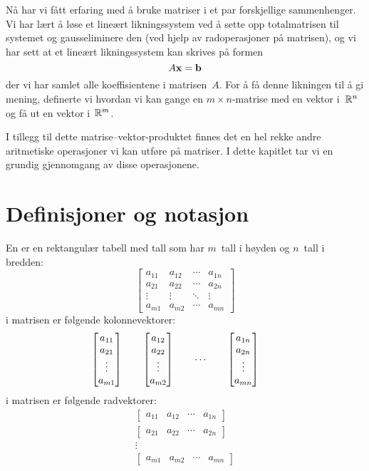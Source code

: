 

\label{ch:matriser}

Nå har vi fått erfaring med å bruke matriser i et par forskjellige
sammenhenger.  Vi har lært å løse et lineært likningssystem ved å
sette opp totalmatrisen til systemet og gausseliminere den (ved hjelp
av radoperasjoner på matrisen), og vi har sett at et lineært
likningssystem kan skrives på formen
\[
A \mathbf{x} = \mathbf{b}
\]
der vi har samlet alle koeffisientene i matrisen~$A$.  For å få denne
likningen til å gi mening, definerte vi hvordan vi kan gange en
$m \times n$-matrise med en vektor i~$\mathbb{R}^n$ og få ut en vektor
i~$\mathbb{R}^m$.

I tillegg til dette matrise--vektor-produktet finnes det en hel rekke
andre aritmetiske operasjoner vi kan utføre på matriser.  I dette
kapitlet tar vi en grundig gjennomgang av disse operasjonene.


\section*{Definisjoner og notasjon}



En  er en rektangulær tabell med tall
som har $m$~tall i høyden og $n$~tall i bredden:
\[
\begin{bmatrix}
a_{11} & a_{12} & \cdots & a_{1n} \\
a_{21} & a_{22} & \cdots & a_{2n} \\
\vdots & \vdots & \ddots & \vdots \\
a_{m1} & a_{m2} & \cdots & a_{mn}
\end{bmatrix}
\]
 i matrisen er følgende kolonnevektorer:
\[
\begin{bmatrix} a_{11} \\ a_{21} \\ \vdots \\ a_{m1} \end{bmatrix}\qquad
\begin{bmatrix} a_{12} \\ a_{22} \\ \vdots \\ a_{m2} \end{bmatrix}\qquad
\cdots\qquad
\begin{bmatrix} a_{1n} \\ a_{2n} \\ \vdots \\ a_{mn} \end{bmatrix}\qquad
\]
 i matrisen er følgende radvektorer:
\begin{gather*}
\begin{bmatrix}
a_{11} & a_{12} & \cdots & a_{1n}
\end{bmatrix}
\\
\begin{bmatrix}
a_{21} & a_{22} & \cdots & a_{2n}
\end{bmatrix}
\\
\vdots
\\
\begin{bmatrix}
a_{m1} & a_{m2} & \cdots & a_{mn}
\end{bmatrix}
\end{gather*}

